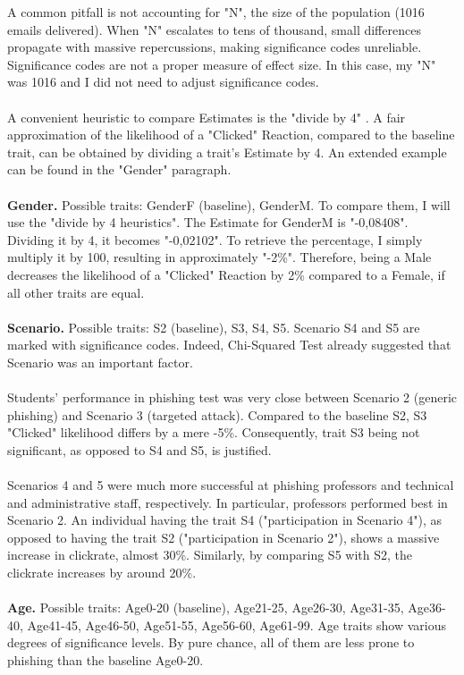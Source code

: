 \documentclass[a4paper]{article}
\begin{document}
\newpage

\noindent
A common pitfall is not accounting for "N", the size of the population (1016 emails delivered). When "N" escalates to tens of thousand, small differences propagate with massive repercussions, making significance codes unreliable. Significance codes are not a proper measure of effect size. In this case, my "N" was 1016 and I did not need to adjust significance codes.
\\ \\
A convenient heuristic to compare Estimates is the "divide by 4" \cite{stats-divide-four}. A fair approximation of the likelihood of a "Clicked" Reaction, compared to the baseline trait, can be obtained by dividing a trait's Estimate by 4. An extended example can be found in the "Gender" paragraph.
\\ \\
\textbf{Gender.} Possible traits: GenderF (baseline), GenderM. To compare them, I will use the "divide by 4 heuristics". The Estimate for GenderM is "-0,08408". Dividing it by 4, it becomes "-0,02102". To retrieve the percentage, I simply multiply it by 100, resulting in approximately "-2\%". Therefore, being a Male decreases the likelihood of a "Clicked" Reaction by 2\% compared to a Female, if all other traits are equal.
\\ \\
\textbf{Scenario.} Possible traits: S2 (baseline), S3, S4, S5. Scenario S4 and S5 are marked with significance codes. Indeed, Chi-Squared Test already suggested that Scenario was an important factor.
\\ \\
Students' performance in phishing test was very close between Scenario 2 (generic phishing) and Scenario 3 (targeted attack). Compared to the baseline S2, S3 "Clicked" likelihood differs by a mere -5\%. Consequently, trait S3 being not significant, as opposed to S4 and S5, is justified.
\\ \\
Scenarios 4 and 5 were much more successful at phishing professors and technical and administrative staff, respectively. In particular, professors performed best in Scenario 2. An individual having the trait S4 ("participation in Scenario 4"), as opposed to having the trait S2 ("participation in Scenario 2"), shows a massive increase in clickrate, almost 30\%. Similarly, by comparing S5 with S2, the clickrate increases by around 20\%.
\\ \\
\textbf{Age.} Possible traits: Age0-20 (baseline), Age21-25, Age26-30, Age31-35, Age36-40, Age41-45, Age46-50, Age51-55, Age56-60, Age61-99. Age traits show various degrees of significance levels. By pure chance, all of them are less prone to phishing than the baseline Age0-20.
\end{document}
